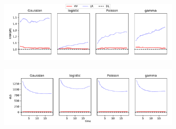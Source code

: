 \documentclass[usenames,dvipsnames,svgnames,table]{beamer}
\begin{document}
\begin{frame}
\begin{figure}
	\begin{subfigure}{1.0\textwidth}
		\includegraphics[width=1.0\textwidth]{images/lorenz-RRMSPE.pdf}
	\end{subfigure}
	\begin{subfigure}{1.0\textwidth}
		\includegraphics[width=1.0\textwidth]{images/lorenz-dLS.pdf}
	\end{subfigure}
	\vspace{-1mm}
	\label{fig:scores-2d}
\end{figure} 
\end{frame}



\end{document}
